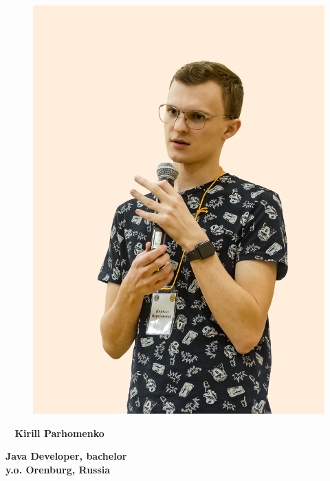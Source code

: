 \begin{figure}
	\hfill
	\includegraphics[width=1.0\columnwidth]{photo}
	\vspace{-7cm}
\end{figure}

\begin{flushright}\small
	
\end{flushright}\normalsize
\framebreak



\Huge\bfseries\ {{\color{Cyan} Kirill} {\color{Black} Parhomenko}} \\
\NegativeSmallSep

\normalsize\bfseries Java Developer, bachelor \\
\small { y.o. Orenburg, Russia}

